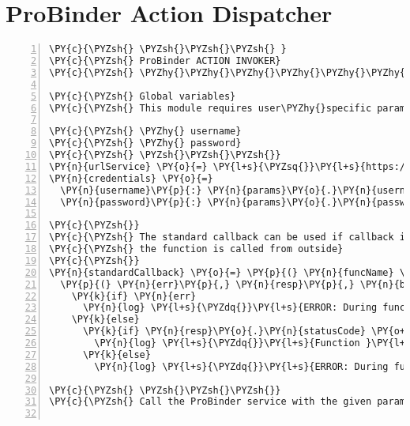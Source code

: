 \section{ProBinder Action Dispatcher\label{pbactiondispatcher}}
\begin{Verbatim}[fontsize=\scriptsize,commandchars=\\\{\},numbers=left,firstnumber=1,stepnumber=1]
\PY{c}{\PYZsh{} \PYZsh{}\PYZsh{}\PYZsh{} }
\PY{c}{\PYZsh{} ProBinder ACTION INVOKER}
\PY{c}{\PYZsh{} \PYZhy{}\PYZhy{}\PYZhy{}\PYZhy{}\PYZhy{}\PYZhy{}\PYZhy{}\PYZhy{}\PYZhy{}\PYZhy{}\PYZhy{}\PYZhy{}\PYZhy{}\PYZhy{}\PYZhy{}\PYZhy{}\PYZhy{}\PYZhy{}\PYZhy{}\PYZhy{}\PYZhy{}\PYZhy{}\PYZhy{}\PYZhy{}}

\PY{c}{\PYZsh{} Global variables}
\PY{c}{\PYZsh{} This module requires user\PYZhy{}specific parameters:}

\PY{c}{\PYZsh{} \PYZhy{} username}
\PY{c}{\PYZsh{} \PYZhy{} password}
\PY{c}{\PYZsh{} \PYZsh{}\PYZsh{}\PYZsh{}}
\PY{n}{urlService} \PY{o}{=} \PY{l+s}{\PYZsq{}}\PY{l+s}{https://probinder.com/service/}\PY{l+s}{\PYZsq{}}
\PY{n}{credentials} \PY{o}{=}
  \PY{n}{username}\PY{p}{:} \PY{n}{params}\PY{o}{.}\PY{n}{username}
  \PY{n}{password}\PY{p}{:} \PY{n}{params}\PY{o}{.}\PY{n}{password}

\PY{c}{\PYZsh{}}
\PY{c}{\PYZsh{} The standard callback can be used if callback is not provided, e.g. if}
\PY{c}{\PYZsh{} the function is called from outside}
\PY{c}{\PYZsh{}}
\PY{n}{standardCallback} \PY{o}{=} \PY{p}{(} \PY{n}{funcName} \PY{p}{)} \PY{o}{\PYZhy{}}\PY{o}{\PYZgt{}}
  \PY{p}{(} \PY{n}{err}\PY{p}{,} \PY{n}{resp}\PY{p}{,} \PY{n}{body} \PY{p}{)} \PY{o}{\PYZhy{}}\PY{o}{\PYZgt{}}
    \PY{k}{if} \PY{n}{err}
      \PY{n}{log} \PY{l+s}{\PYZdq{}}\PY{l+s}{ERROR: During function }\PY{l+s}{\PYZsq{}}\PY{l+s}{\PYZsh{}\PYZob{} funcName \PYZcb{}}\PY{l+s}{\PYZsq{}}\PY{l+s}{\PYZdq{}}
    \PY{k}{else}
      \PY{k}{if} \PY{n}{resp}\PY{o}{.}\PY{n}{statusCode} \PY{o+ow}{is} \PY{l+m+mi}{200}
        \PY{n}{log} \PY{l+s}{\PYZdq{}}\PY{l+s}{Function }\PY{l+s}{\PYZsq{}}\PY{l+s}{\PYZsh{}\PYZob{} funcName \PYZcb{}}\PY{l+s}{\PYZsq{}}\PY{l+s}{ ran through without error}\PY{l+s}{\PYZdq{}}
      \PY{k}{else}
        \PY{n}{log} \PY{l+s}{\PYZdq{}}\PY{l+s}{ERROR: During function }\PY{l+s}{\PYZsq{}}\PY{l+s}{\PYZsh{}\PYZob{} funcName \PYZcb{}}\PY{l+s}{\PYZsq{}}\PY{l+s}{: \PYZsh{}\PYZob{} body.error.message \PYZcb{}}\PY{l+s}{\PYZdq{}}

\PY{c}{\PYZsh{} \PYZsh{}\PYZsh{}\PYZsh{}}
\PY{c}{\PYZsh{} Call the ProBinder service with the given parameters.}


\end{Verbatim}
